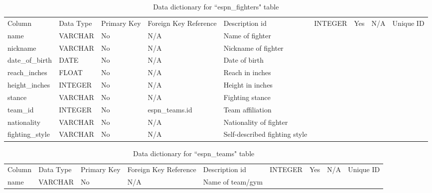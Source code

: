 \documentclass[12pt,twoside]{report}
\begin{document}
\tiny 
\begin{longtable}{lllll}
\caption{Data dictionary for ``espn\_fighters" table}\\ 
\toprule
Column          & Data Type & Primary Key & Foreign Key Reference & Description                    \endfirsthead 
\toprule
id              & INTEGER   & Yes         & N/A                   & Unique ID                      \\
name            & VARCHAR   & No          & N/A                   & Name of fighter                \\
nickname        & VARCHAR   & No          & N/A                   & Nickname of fighter            \\
date\_of\_birth & DATE      & No          & N/A                   & Date of birth                  \\
reach\_inches   & FLOAT     & No          & N/A                   & Reach in inches                \\
height\_inches  & INTEGER   & No          & N/A                   & Height in inches               \\
stance          & VARCHAR   & No          & N/A                   & Fighting stance                \\
team\_id        & INTEGER   & No          & espn\_teams.id        & Team affiliation               \\
nationality     & VARCHAR   & No          & N/A                   & Nationality of fighter         \\
fighting\_style & VARCHAR   & No          & N/A                   & Self-described fighting style  \\
\bottomrule
\end{longtable}
\normalsize

\tiny 
\begin{longtable}{lllll}
\caption{Data dictionary for ``espn\_teams" table}\\ 
\toprule
Column & Data Type & Primary Key & Foreign Key Reference & Description       \endfirsthead 
\toprule
id     & INTEGER   & Yes         & N/A                   & Unique ID         \\
name   & VARCHAR   & No          & N/A                   & Name of team/gym  \\
\bottomrule
\end{longtable}
\normalsize
\end{document}

